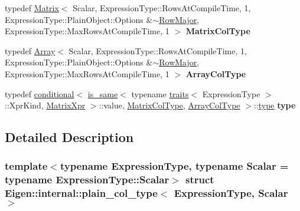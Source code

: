 \begin{DoxyCompactItemize}
\item 
\mbox{\label{struct_eigen_1_1internal_1_1plain__col__type_ac75ab0cd71ee5bed5adbd9b77eeba12a}} 
typedef \hyperlink{group___core___module_class_eigen_1_1_matrix}{Matrix}$<$ Scalar, Expression\+Type\+::\+Rows\+At\+Compile\+Time, 1, Expression\+Type\+::\+Plain\+Object\+::\+Options \&$\sim$\hyperlink{group__enums_ggaacded1a18ae58b0f554751f6cdf9eb13acfcde9cd8677c5f7caf6bd603666aae3}{Row\+Major}, Expression\+Type\+::\+Max\+Rows\+At\+Compile\+Time, 1 $>$ {\bfseries Matrix\+Col\+Type}
\item 
\mbox{\label{struct_eigen_1_1internal_1_1plain__col__type_a17712acb2f07a712205370a99a62f402}} 
typedef \hyperlink{group___core___module_class_eigen_1_1_array}{Array}$<$ Scalar, Expression\+Type\+::\+Rows\+At\+Compile\+Time, 1, Expression\+Type\+::\+Plain\+Object\+::\+Options \&$\sim$\hyperlink{group__enums_ggaacded1a18ae58b0f554751f6cdf9eb13acfcde9cd8677c5f7caf6bd603666aae3}{Row\+Major}, Expression\+Type\+::\+Max\+Rows\+At\+Compile\+Time, 1 $>$ {\bfseries Array\+Col\+Type}
\item 
\mbox{\label{struct_eigen_1_1internal_1_1plain__col__type_a0084ea2ac7f2803ac1c1c13e968e6b04}} 
typedef \hyperlink{struct_eigen_1_1internal_1_1conditional}{conditional}$<$ \hyperlink{struct_eigen_1_1internal_1_1is__same}{is\+\_\+same}$<$ typename \hyperlink{struct_eigen_1_1internal_1_1traits}{traits}$<$ Expression\+Type $>$\+::Xpr\+Kind, \hyperlink{struct_eigen_1_1_matrix_xpr}{Matrix\+Xpr} $>$\+::value, \hyperlink{group___core___module_class_eigen_1_1_matrix}{Matrix\+Col\+Type}, \hyperlink{group___core___module_class_eigen_1_1_array}{Array\+Col\+Type} $>$\+::\hyperlink{class_eigen_1_1internal_1_1_tensor_lazy_evaluator_writable}{type} {\bfseries type}
\end{DoxyCompactItemize}


\subsection{Detailed Description}
\subsubsection*{template$<$typename Expression\+Type, typename Scalar = typename Expression\+Type\+::\+Scalar$>$\newline
struct Eigen\+::internal\+::plain\+\_\+col\+\_\+type$<$ Expression\+Type, Scalar $>$}



